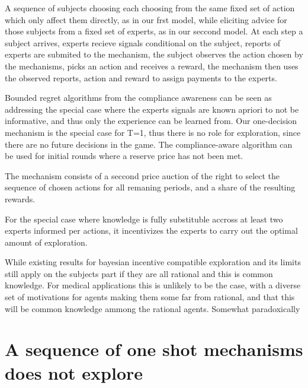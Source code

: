  A sequence of subjects choosing each choosing from the same fixed set of action which only affect them directly, as in our frst model, while eliciting advice for those subjects from a fixed set of experts, as in our seccond model. 
At each step a subject arrives, experts recieve signals conditional on the subject, reports of experts are submited to the mechanism, the subject observes the action chosen by the mechanisms, picks an action and receives a reward, the mechanism then uses the observed reports, action and reward to assign payments to the experts.

Bounded regret algorithms from the compliance awareness can be seen as addressing the special case where the experts signals are known apriori to not be informative, and thus only the experience can be learned from. Our one-decision mechanism is the special case for T=1, thus there is no role for exploration, since there are no future decisions in the game.
The compliance-aware algorithm can be used for initial rounds where a reserve price has not been met.

The mechanism consists of a seccond price auction of the right to select the sequence of chosen actions for all remaning periods, and a share of the resulting rewards.

For the special case where knowledge is  fully substituble accross at least two experts informed per actions, it incentivizes the experts to carry out the optimal amount of exploration. 

While existing results for bayesian incentive compatible exploration and its limits still apply on the subjects part if they are all rational and this is common knowledge. For medical applications this is unlikely to be the case, with a diverse set of motivations for agents making them some far from rational, and that this will be common knowledge ammong the rational agents. Somewhat paradoxically 



\section{A sequence of one shot mechanisms does not explore}

